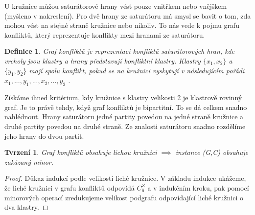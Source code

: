 \documentclass[12pt,a4report]{report}
\newtheorem{def1}{Definice}
\newtheorem{tvrz2}{Tvrzení}
\begin{document}
U kružnice můžou saturátorové hrany vést pouze vnitřkem nebo vnějškem (myšleno v nakreslení). Pro dvě hrany ze saturátoru má smysl se bavit o tom, zda mohou vést na stejné straně kružnice nebo nikoliv. To nás vede k pojmu grafu konfliktů, který reprezentuje konflikty mezi hranami ze saturátoru. 

\begin{def1}
Graf konfliktů je reprezentací konfliktů saturátorových hran, kde vrcholy jsou klastry a hrany představují konfliktní klastry. Klastry $\{x_1, x_2\}$ a $\{y_1, y_2\}$ mají spolu konflikt, pokud se na kružnici vyskytují v následujícím pořádí $x_1 , ..., y_1, ..., x_2, ..., y_2$ .
\end{def1}

Získáme ihned kritérium, kdy kružnice s klastry velikosti 2 je klastrově rovinný graf. Je to právě tehdy, když graf konfliktů je bipartitní. To se dá celkem snadno nahlédnout. Hrany saturátoru jedné partity povedou na jedné straně kružnice a druhé partity povedou na druhé straně. Ze znalosti saturátoru snadno rozdělíme jeho hrany do dvou partit.

\begin{tvrz2}
Graf konfliktů obsahuje lichou kružnici $\implies$ instance (G,C) obsahuje zakázaný minor.
\end{tvrz2}
\begin{proof}
Důkaz indukcí podle velikosti liché kružnice. V základu indukce ukážeme, že liché kružnici v grafu konfliktů odpovídá $C_6^Z$ a v indukčním kroku, pak pomocí minorových operací zredukujeme velikost podgrafu odpovídající liché kružnici o dva klastry. 
\end{proof}
\end{document}
